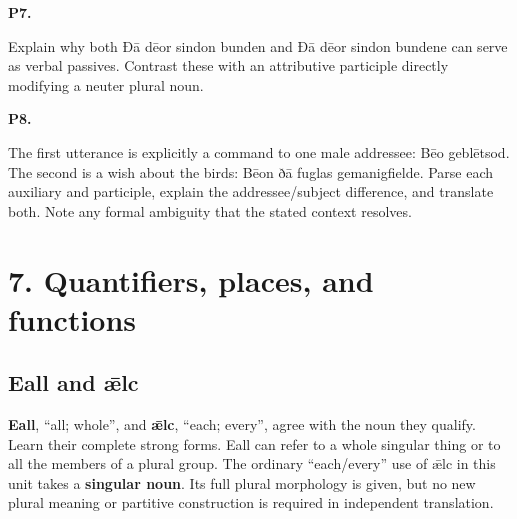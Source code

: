 \par\begin{minipage}{\linewidth}\raggedright
\textbf{P7.}

Explain why both Ðā dēor sindon bunden and Ðā dēor sindon bundene can serve as verbal passives. Contrast these with an attributive participle directly modifying a neuter plural noun.

\end{minipage}\par\addvspace{4pt}

\par\begin{minipage}{\linewidth}\raggedright
\textbf{P8.}

The first utterance is explicitly a command to one male addressee: Bēo geblētsod. The second is a wish about the birds: Bēon ðā fuglas gemanigfielde. Parse each auxiliary and participle, explain the addressee/\allowbreak{}subject difference, and translate both. Note any formal ambiguity that the stated context resolves.

\end{minipage}\par\addvspace{4pt}

\section*{7. Quantifiers, places, and functions}

\subsection*{Eall and ǣlc}

\textbf{Eall}, “all; whole”, and \textbf{ǣlc}, “each; every”, agree with the noun they qualify. Learn their complete strong forms. Eall can refer to a whole singular thing or to all the members of a plural group. The ordinary “each/\allowbreak{}every” use of ǣlc in this unit takes a \textbf{singular noun}. Its full plural morphology is given, but no new plural meaning or partitive construction is required in independent translation.

